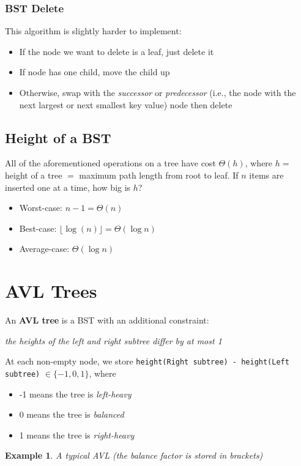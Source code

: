 \documentclass{report}
\newtheorem{ex}{Example}[section]
\begin{document}
\subsubsection{BST Delete}
This algorithm is slightly harder to implement:
\begin{itemize}
\item If the node we want to delete is a leaf, just delete it
\item If node has one child, move the child up
\item Otherwise, swap with the \textit{successor} or \textit{predecessor} (i.e., the node with the next largest or next smallest key value) node then delete
\end{itemize}
\subsection{Height of a BST}
All of the aforementioned operations on a tree have cost $\Theta(h)$, where $h =$ height of a tree $=$ maximum path length from root to leaf. If $n$ items are inserted one at a time, how big is $h$?
\begin{itemize}
\item Worst-case: $n-1 = \Theta(n)$
\item Best-case: $\lfloor \log(n) \rfloor =\Theta(\log n)$
\item Average-case: $\Theta(\log n)$
\end{itemize}
\section{AVL Trees}
An \textbf{AVL tree} is a BST with an additional constraint:
\begin{center}
\textit{the heights of the left and right subtree differ by at most 1}
\end{center}
At each non-empty node, we store \texttt{height(Right subtree) - height(Left subtree)} $\in \{-1, 0, 1\}$, where
\begin{itemize}
\item -1 means the tree is \textit{left-heavy}
\item 0 means the tree is \textit{balanced}
\item 1 means the tree is \textit{right-heavy}
\end{itemize}
\begin{ex}
A typical AVL (the balance factor is stored in brackets)
\end{ex}
\begin{center}
\end{center}
\end{document}
